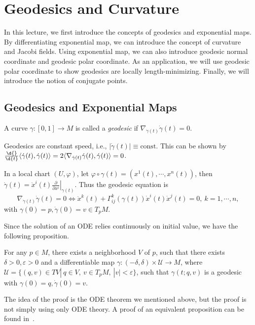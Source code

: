 \chapter{Geodesics and Curvature}
In this lecture, we first introduce the concepts of geodesics and exponential maps.
By differentiating exponential map, we can introduce the concept of curvature and Jacobi fields.
Using exponential map, we can also introduce geodesic normal coordinate and geodesic polar coordinate.
As an application, we will use geodesic polar coordinate to show geodesics are locally length-minimizing.
Finally, we will introduce the notion of conjugate points.

\section{Geodesics and Exponential Maps}
\begin{defn}
    A curve $\gamma:[0,1]\to M$ is called a \emph{geodesic} if $\nabla_{\dot{\gamma}(t)}\dot{\gamma}(t)=0$.
\end{defn}

\begin{rem}
    Geodesics are constant speed, i.e., $|\dot{\gamma}(t)|\equiv\text{const}$.
    This can be shown by $\frac{\d{}}{\d{t}}\langle\dot{\gamma}(t),\dot{\gamma}(t)\rangle=2\langle\nabla_{\dot{\gamma}(t)}\dot{\gamma}(t),\dot{\gamma}(t)\rangle=0$.
\end{rem}

In a local chart $(U,\varphi)$, let $\varphi\circ\gamma(t)=(x^1(t),\cdots,x^n(t))$, then $\dot{\gamma}(t)=\dot{x}^i(t)\left.\frac{\partial{}}{\partial{x^i}}\right|_{\gamma(t)}$.
Thus the geodesic equation is
\[\nabla_{\dot{\gamma}(t)}\dot{\gamma}(t)=0\iff\ddot{x}^k(t)+\Gamma^k_{ij}(\gamma(t))\dot{x}^i(t)\dot{x}^j(t)=0,\ k=1,\cdots,n,\]
with $\gamma(0)=p,\dot{\gamma}(0)=v\in T_pM$.

Since the solution of an ODE relies continuously on initial value, we have the following proposition.
\begin{prop}\label{geodesic in nbhd}
    For any $p\in M$, there exists a neighborhood $V$ of $p$, such that there exists $\delta>0,\varepsilon>0$ and a differentiable map $\gamma:(-\delta,\delta)\times\mathscr{U}\to M$, where $\mathscr{U}=\{(q,v)\in TV|\ q\in V,\ v\in T_pM,\ |v|<\varepsilon\}$, such that $\gamma(t;q,v)$ is a geodesic with $\gamma(0)=q,\dot{\gamma}(0)=v$.
\end{prop}
The idea of the proof is the ODE theorem we mentioned above, but the proof is not simply using only ODE theory.
A proof of an equivalent proposition can be found in~\cite[Chapter~3.~Lemma~1]{Wu}.

